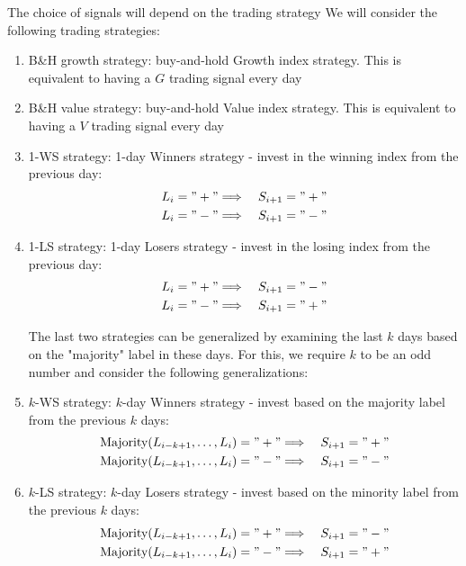 \documentclass{article}
\begin{document}
The choice of signals will depend on the trading strategy
We will consider the following trading strategies:
\begin{enumerate}
\item B{\&}H growth strategy: buy-and-hold Growth index strategy. This is equivalent to having a $G$ trading signal every day
\item B{\&}H value strategy:  buy-and-hold Value index strategy. This is equivalent to having a $V$ trading signal every day

\item 1-WS strategy: 1-day Winners strategy - invest in the winning index from the previous day:
\begin{equation*}
\begin{split}
    L_{i}="+" & \Longrightarrow \quad S_{i+1}="+"\\
    L_{i}="-" & \Longrightarrow \quad S_{i+1}="-"
    \end{split}
\end{equation*}

\item 1-LS strategy: 1-day Losers strategy - invest in the losing index from the previous day:
\begin{equation*}
\begin{split}
    L_{i}="+" & \Longrightarrow \quad S_{i+1}="-"\\
    L_{i}="-" & \Longrightarrow \quad S_{i+1}="+"
    \end{split}
\end{equation*}


The last two strategies can be generalized by examining the last $k$ days based on the "majority" label in these days. For this, we require $k$ to be an odd number and consider the following generalizations:

\item $k$-WS strategy: $k$-day Winners strategy - invest based on the majority label from the previous $k$ days:
\begin{equation*}
\begin{split}
    \hbox{Majority}(L_{i-k+1},\ldots,L_{i})="+" & \Longrightarrow \quad S_{i+1}="+"\\
    \hbox{Majority}(L_{i-k+1},\ldots,L_{i})="-" & \Longrightarrow \quad S_{i+1}="-"
    \end{split}
\end{equation*}

\item $k$-LS strategy: $k$-day Losers strategy - invest  based on the minority label from the previous $k$ days:
\begin{equation*}
\begin{split}
    \hbox{Majority}(L_{i-k+1},\ldots,L_{i})="+" & \Longrightarrow \quad S_{i+1}="-"\\
    \hbox{Majority}(L_{i-k+1},\ldots,L_{i})="-" & \Longrightarrow \quad S_{i+1}="+"
    \end{split}
\end{equation*}

\end{enumerate}
\end{document}
